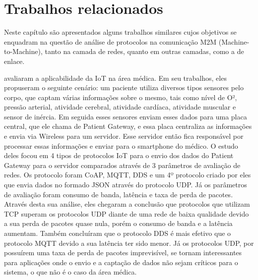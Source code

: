 \chapter{Trabalhos relacionados}

Neste capítulo são apresentados alguns trabalhos similares cujos objetivos se enquadram na questão de análise de protocolos na comunicação M2M (Machine-to-Machine), tanto na camada de redes, quanto em outras camadas, como a de enlace.

\cite{chen2016performance} avaliaram a aplicabilidade da IoT na área médica. Em seu trabalhos, eles propuseram o seguinte cenário: um paciente utiliza diversos tipos sensores pelo corpo, que captam várias informações sobre o mesmo, tais como nível de O², pressão arterial, atividade cerebral, atividade cardíaca, atividade muscular e sensor de inércia. Em seguida esses sensores enviam esses dados para uma placa central, que ele chama de Patient Gateway, e essa placa centraliza as informações e envia via Wireless para um servidor. Esse servidor então fica responsável por processar essas informações e enviar para o smartphone do médico. 
O estudo deles focou em 4 tipos de protocolos IoT para o envio dos dados do Patient Gateway para o servidor comparados através de 3 parâmetros de avaliação de redes. Os protocolo foram CoAP, MQTT, DDS e um 4º protocolo criado por eles que envia dados no formado JSON através do protocolo UDP. Já os parâmetros de avaliação foram consumo de banda, latência e taxa de perda de pacotes. 
Através desta sua análise, eles chegaram a conclusão que protocolos que utilizam TCP superam os protocolos UDP diante de uma rede de baixa qualidade devido a sua perda de pacotes quase nula, porém o consumo de banda e a latência aumentam. Também concluíram que o protocolo DDS é mais efetivo que o protocolo MQTT devido a sua latência ter sido menor. Já os protocolos UDP, por possuírem uma taxa de perda de pacotes imprevisível, se tornam interessantes para aplicações onde o envio e a captação de dados não sejam críticos para o sistema, o que não é o caso da área médica. 

